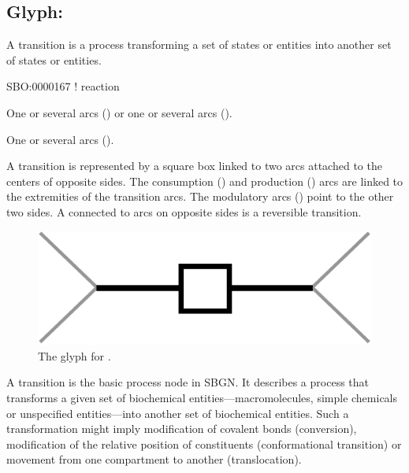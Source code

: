 

\subsection{Glyph: }
\label{sec:transition}

A transition is a process transforming a set of states or entities into another set of states or entities.

\begin{glyphDescription}

\glyphSboTerm SBO:0000167 ! reaction

\glyphOrigin One or several  arcs () or one or several  arcs ().

\glyphTarget One or several  arcs ().

\glyphNode A transition is represented by a square box linked to two arcs attached to the centers of opposite sides. The consumption () and production () arcs are linked to the extremities of the transition arcs. The modulatory arcs () point to the other two sides. A  connected to  arcs on opposite sides is a reversible transition.

\end{glyphDescription}

\begin{figure}[H]
  \centering
  \includegraphics[scale = 0.4]{images/transition}
  \caption{The \PD glyph for .}
  \label{fig:transition}
\end{figure}

A transition is the basic process node in SBGN.  It describes a process that transforms a given set of biochemical entities---macromolecules, simple chemicals or unspecified entities---into another set of biochemical entities.  Such a transformation might imply modification of covalent bonds (conversion), modification of the relative position of constituents (conformational transition) or movement from one compartment to another (translocation).

